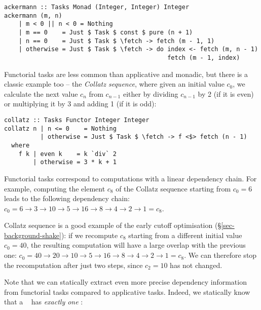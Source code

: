 \vspace{1mm}
\begin{verbatim}
ackermann :: Tasks Monad (Integer, Integer) Integer
ackermann (m, n)
    | m < 0 || n < 0 = Nothing
    | m == 0    = Just $ Task $ const $ pure (n + 1)
    | n == 0    = Just $ Task $ \fetch -> fetch (m - 1, 1)
    | otherwise = Just $ Task $ \fetch -> do index <- fetch (m, n - 1)
                                             fetch (m - 1, index)
\end{verbatim}
\vspace{1mm}

\noindent
Functorial tasks are less common than applicative and monadic, but there is a
classic example too -- the \emph{Collatz sequence}, where given an initial value
$c_0$, we calculate the next value $c_n$ from $c_{n-1}$ either by dividing
$c_{n-1}$ by 2 (if it is even) or multiplying it by 3 and adding 1 (if it is
odd):

\vspace{1mm}
\begin{verbatim}
collatz :: Tasks Functor Integer Integer
collatz n | n <= 0    = Nothing
          | otherwise = Just $ Task $ \fetch -> f <$> fetch (n - 1)
  where
    f k | even k    = k `div` 2
        | otherwise = 3 * k + 1
\end{verbatim}
\vspace{1mm}

\noindent
Functorial tasks correspond to computations with a linear dependency chain. For
example, computing the element $c_8$ of the Collatz sequence starting from
$c_0=6$ leads to the following dependency chain:
$c_0 = 6 \rightarrow 3 \rightarrow 10 \rightarrow 5 \rightarrow 16 \rightarrow 8
\rightarrow 4 \rightarrow 2 \rightarrow 1 = c_8$.

Collatz sequence is a good example of the early cutoff optimisation
(\S\ref{sec-background-shake}): if we recompute $c_8$ starting from a different
initial value $c_0=40$, the resulting computation will have a large overlap with
the previous one:
$c_0 = 40 \rightarrow 20 \rightarrow 10 \rightarrow 5 \rightarrow 16 \rightarrow
8 \rightarrow 4 \rightarrow 2 \rightarrow 1 = c_8$. We can therefore stop the
recomputation after just two steps, since $c_2=10$ has not changed.

Note that we can statically extract even more precise dependency information
from functorial tasks compared to applicative tasks. Indeed, we statically know
that a ~ has \emph{exactly one} :

